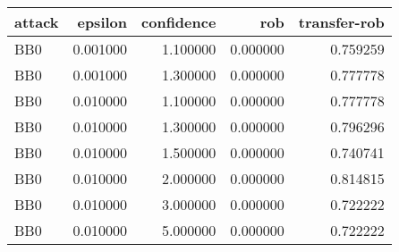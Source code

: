 \begin{tabular}{lrrrr}
\toprule
attack & epsilon & confidence & rob & transfer-rob \\
\midrule
BB0 & 0.001000 & 1.100000 & 0.000000 & 0.759259 \\
BB0 & 0.001000 & 1.300000 & 0.000000 & 0.777778 \\
BB0 & 0.010000 & 1.100000 & 0.000000 & 0.777778 \\
BB0 & 0.010000 & 1.300000 & 0.000000 & 0.796296 \\
BB0 & 0.010000 & 1.500000 & 0.000000 & 0.740741 \\
BB0 & 0.010000 & 2.000000 & 0.000000 & 0.814815 \\
BB0 & 0.010000 & 3.000000 & 0.000000 & 0.722222 \\
BB0 & 0.010000 & 5.000000 & 0.000000 & 0.722222 \\
\bottomrule
\end{tabular}
